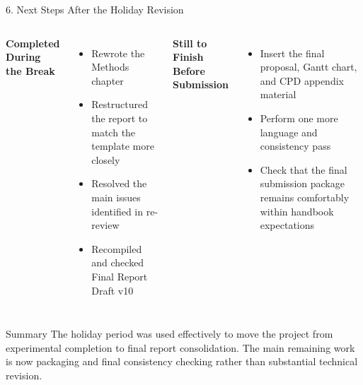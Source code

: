 \documentclass[aspectratio=169, 11pt]{beamer}
\begin{document}
\begin{frame}[shrink=6]{6. Next Steps After the Holiday Revision}

    \begin{columns}[T]
        \textbf{Completed During the Break}
        \begin{itemize}
            \item Rewrote the Methods chapter
            \item Restructured the report to match the template more closely
            \item Resolved the main issues identified in re-review
            \item Recompiled and checked Final Report Draft v10
        \end{itemize}

        \textbf{Still to Finish Before Submission}
        \begin{itemize}
            \item Insert the final proposal, Gantt chart, and CPD appendix material
            \item Perform one more language and consistency pass
            \item Check that the final submission package remains comfortably within handbook expectations
        \end{itemize}
    \end{columns}

    \vspace{3mm}
    \begin{alertblock}{Summary}
        The holiday period was used effectively to move the project from experimental completion to final report consolidation. The main remaining work is now packaging and final consistency checking rather than substantial technical revision.
    \end{alertblock}
\end{frame}
\end{document}
